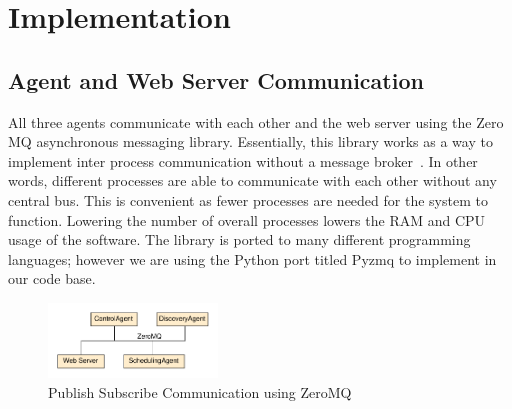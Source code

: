 \chapter{Implementation}
\label{ch: Chapter3}

\section{Agent and Web Server Communication}

All three agents communicate with each other and the web server using the Zero
MQ asynchronous messaging library. Essentially, this library
works as a way to implement inter process communication without a message
broker~\cite{zeromq}. In other words, different processes are able to communicate with each
other without any central bus. This is convenient as fewer processes are needed
for the system to function. Lowering the number of overall processes lowers the
RAM and CPU usage of the software. The library is ported to many different
programming languages; however we are using the Python port titled Pyzmq to
implement in our code base.
%
\begin{figure}
    \centering
    \includegraphics[width=0.4\textwidth]{figs/pubSubAgents.pdf}
    \caption{Publish Subscribe Communication using ZeroMQ}
    \label{fig:pubSubAgents}
\end{figure}

